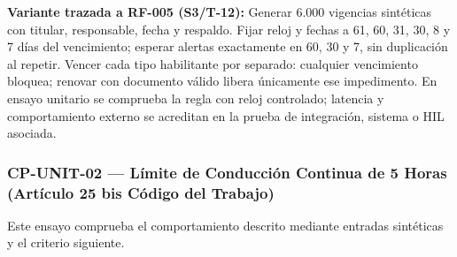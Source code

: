 \par\noindent\textbf{Variante trazada a RF-005 (S3/T-12):} Generar 6.000 vigencias sintéticas con titular, responsable, fecha y respaldo. Fijar reloj y fechas a 61, 60, 31, 30, 8 y 7 días del vencimiento; esperar alertas exactamente en 60, 30 y 7, sin duplicación al repetir. Vencer cada tipo habilitante por separado: cualquier vencimiento bloquea; renovar con documento válido libera únicamente ese impedimento. En ensayo unitario se comprueba la regla con reloj controlado; latencia y comportamiento externo se acreditan en la prueba de integración, sistema o HIL asociada.\par
\subsubsection*{CP-UNIT-02 — Límite de Conducción Continua de 5 Horas (Artículo 25 bis Código del Trabajo)}\label{sec:9-cp-unit-02}
Este ensayo comprueba el comportamiento descrito mediante entradas sintéticas y el criterio siguiente.

